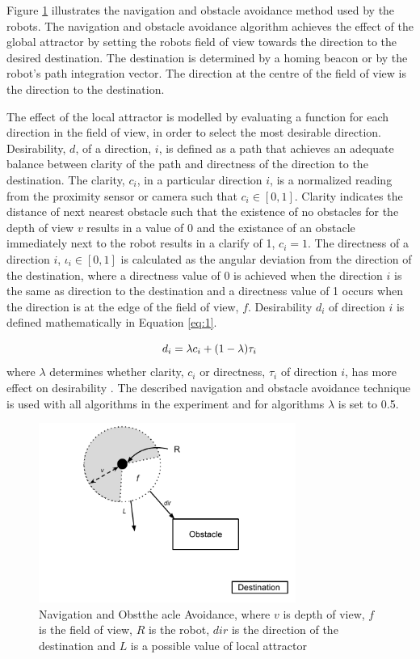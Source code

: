 Figure \ref{fig:obstacleavoidance} illustrates the navigation and obstacle avoidance method used by the robots. The navigation and obstacle avoidance algorithm achieves the effect of the global attractor by setting the robots field of view towards the direction to the desired destination. The destination is determined by a homing beacon or by the robot's path integration vector. The direction at the centre of the field of view is the direction to the destination. 

The effect of the local attractor is modelled by evaluating a function for each direction in the field of view, in order to select the most desirable direction. Desirability, $d$, of a direction, $i$, is defined as a path that achieves an adequate balance between clarity of the path and directness of the direction to the destination. The clarity,  $c_i$, in a particular direction $i$, is a normalized reading from the proximity sensor or camera such that $c_i\in[0,1]$. Clarity indicates the distance of next nearest obstacle such that the existence of no obstacles for the depth of view $v$ results in a value of 0 and the existance of an obstacle immediately next to the robot results in a clarify of 1, $c_i=1$. The directness of a direction $i$, $\iota_i\in[0,1]$ is calculated as the angular deviation from the direction of the destination, where a directness value of 0 is achieved when the direction $i$ is the same as direction to the destination and a directness value of 1 occurs when the direction is at the edge of the field of view, $f$. Desirability $d_i$ of direction $i$ is defined mathematically in Equation \ref{eq:1}.

\begin{equation}
	d_i= \lambda c_i + (1 - \lambda)\tau_i \\
	\label{eq:1}
\end{equation} where $\lambda$ determines whether clarity, $c_i$ or directness, $\tau_i$ of direction $i$, has more effect on desirability
. The described navigation and obstacle avoidance technique is used with all algorithms in the experiment and for algorithms $\lambda$ is set to 0.5.

\begin{figure}
	\centering
	\includegraphics[width=0.75\textwidth]{chapters/chapter5/figures/ObstacleAvoidance.pdf}
	\caption{Navigation and Obstthe acle Avoidance, where $v$ is depth of view, $f$ is the field of view, $R$ is the robot, $dir$ is the direction of the destination and $L$ is a possible value of local attractor}
	\label{fig:obstacleavoidance}
\end{figure}


